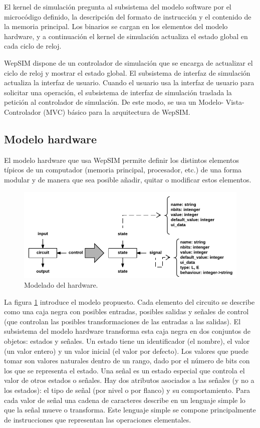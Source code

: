 El kernel de simulación pregunta al subsistema del modelo software por el microcódigo definido, la descripción del formato de instrucción y el contenido de la memoria principal. Los binarios se cargan en los elementos del modelo hardware, y a continuación el kernel de simulación actualiza el estado global en cada ciclo de reloj.


WepSIM dispone de un controlador de simulación que se encarga de actualizar el ciclo de reloj y mostrar el estado global. El subsistema de interfaz de simulación actualiza la interfaz de usuario. Cuando el usuario usa la interfaz de usuario para solicitar una operación, el subsistema de interfaz de simulación traslada la petición al controlador de simulación. De este modo, se usa un Modelo- Vista-Controlador (MVC) básico para la arquitectura de WepSIM.

\subsection{Modelo hardware}

El modelo hardware que usa WepSIM permite definir los distintos elementos típicos de un computador (memoria principal, procesador, etc.) de una forma modular y de manera que sea posible añadir, quitar o modificar estos elementos.

\begin{figure}[htbp]
 	\centering
 	\includegraphics[width=14cm]{figures/hardware_model}
 	\caption{Modelado del hardware.}
	\label{fig:hardware_model_diagram}
\end{figure}

La figura \ref{fig:hardware_model_diagram} introduce el modelo propuesto. Cada elemento del circuito se describe como una caja negra con posibles entradas, posibles salidas y señales de control (que controlan las posibles transformaciones de las entradas a las salidas). El subsistema del modelo hardware transforma esta caja negra en dos conjuntos de objetos: estados y señales. Un estado tiene un identificador (el nombre), el valor (un valor entero) y un valor inicial (el valor por defecto). Los valores que puede tomar son valores naturales dentro de un rango, dado por el número de bits con los que se representa el estado. Una señal es un estado especial que controla el valor de otros estados o señales. Hay dos atributos asociados a las señales (y no a los estados): el tipo de señal (por nivel o por flanco) y su comportamiento. Para cada valor de señal una cadena de caracteres describe en un lenguaje simple lo que la señal mueve o transforma. Este lenguaje simple se compone principalmente de instrucciones que representan las operaciones elementales.

